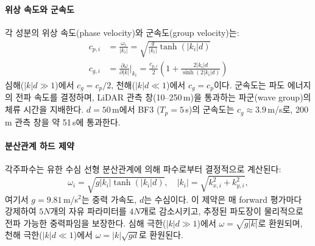 \documentclass[11pt]{report}
\numberwithin{equation}{chapter}
\numberwithin{figure}{chapter}
\numberwithin{table}{chapter}
\begin{document}
\paragraph{위상 속도와 군속도}
각 성분의 위상 속도(phase velocity)와 군속도(group velocity)는:
\begin{align}
  c_{p,i} &= \frac{\omega_i}{|k_i|} = \sqrt{\frac{g}{|k_i|}\tanh(|k_i|d)}
  \label{eq:phase_vel} \\
  c_{g,i} &= \frac{\partial\omega}{\partial|k|}\bigg|_{k_i}
    = \frac{c_{p,i}}{2}\left(1 + \frac{2|k_i|d}{\sinh(2|k_i|d)}\right)
  \label{eq:group_vel}
\end{align}
심해($|k|d \gg 1$)에서 $c_g = c_p/2$, 천해($|k|d \ll 1$)에서 $c_g = c_p$이다.
군속도는 파도 에너지의 전파 속도를 결정하며,
LiDAR 관측 창(10--250\,m)을 통과하는 파군(wave group)의 체류 시간을 지배한다.
$d=50$\,m에서 BF3 ($T_p=5$\,s)의 군속도는 $c_g \approx 3.9$\,m/s로,
200\,m 관측 창을 약 51\,s에 통과한다.

\paragraph{분산관계 하드 제약}
각주파수는 유한 수심 선형 분산관계에 의해 파수로부터 결정적으로 계산된다:
\begin{equation}
  \omega_i = \sqrt{g |k_i| \tanh(|k_i| d)}, \quad |k_i| = \sqrt{k_{x,i}^2 + k_{y,i}^2},
  \label{eq:dispersion}
\end{equation}
여기서 $g = 9.81$\,m/s$^2$는 중력 가속도, $d$는 수심이다.
이 제약은 매 forward 평가마다 강제하여 $5N$개의 자유 파라미터를 $4N$개로 감소시키고,
추정된 파도장이 물리적으로 전파 가능한 중력파임을 보장한다.
심해 극한($|k|d \gg 1$)에서 $\omega = \sqrt{g|k|}$로 환원되며,
천해 극한($|k|d \ll 1$)에서 $\omega = |k|\sqrt{gd}$로 환원된다.
\end{document}
